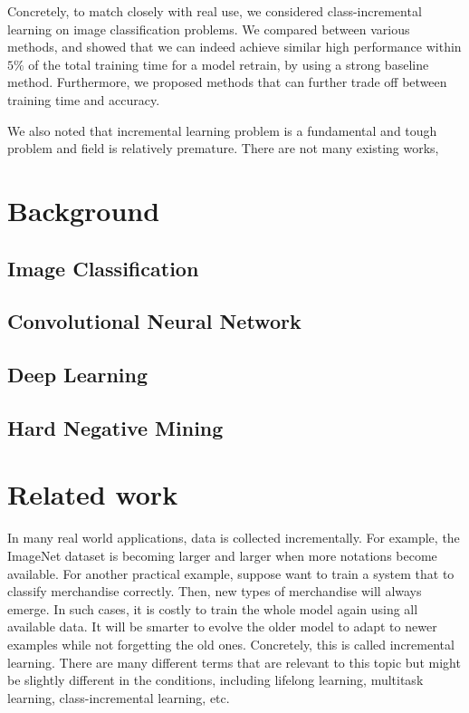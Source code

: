 Concretely, to match closely with real use, we considered class-incremental learning on image classification problems. We compared between various methods, and showed that we can indeed achieve similar high performance within $5\%$ of the total training time for a model retrain, by using a strong baseline method. Furthermore, we proposed methods that can further trade off between training time and accuracy.

We also noted that incremental learning problem is a fundamental and tough problem and field is relatively premature. There are not many existing works, 

\section{Background}

\subsection{Image Classification}

\subsection{Convolutional Neural Network}
\subsection{Deep Learning}
\subsection{Hard Negative Mining}

\section{Related work}
In many real world applications, data is collected incrementally. For example, the ImageNet dataset is becoming larger and larger when more notations become available. For another practical example, suppose want to train a system that to classify merchandise correctly. Then, new types of merchandise will always emerge. In such cases, it is costly to train the whole model again using all available data. It will be smarter to evolve the older model to adapt to newer examples while not forgetting the old ones. Concretely, this is called incremental learning. There are many different terms that are relevant to this topic but might be slightly different in the conditions, including lifelong learning, multitask learning, class-incremental learning, etc.\cite{utgoff1989incremental}

